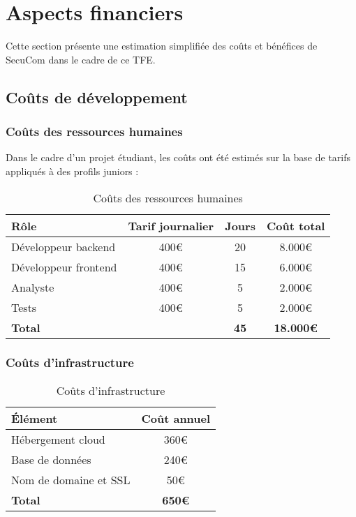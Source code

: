 \chapter{Aspects financiers}

Cette section présente une estimation simplifiée des coûts et bénéfices de SecuCom dans le cadre de ce TFE.

\section{Coûts de développement}

\subsection{Coûts des ressources humaines}

Dans le cadre d'un projet étudiant, les coûts ont été estimés sur la base de tarifs appliqués à des profils juniors :
\begin{table}[h]
\centering
\begin{tabular}{|l|c|c|c|}
\hline
\textbf{Rôle} & \textbf{Tarif journalier} & \textbf{Jours} & \textbf{Coût total} \\
\hline
Développeur backend & 400€ & 20 & 8.000€ \\
Développeur frontend & 400€ & 15 & 6.000€ \\
Analyste & 400€ & 5 & 2.000€ \\
Tests & 400€ & 5 & 2.000€ \\
\hline
\textbf{Total} & & \textbf{45} & \textbf{18.000€} \\
\hline
\end{tabular}
\caption{Coûts des ressources humaines}
\end{table}

\subsection{Coûts d'infrastructure}

\begin{table}[h]
\centering
\begin{tabular}{|l|c|}
\hline
\textbf{Élément} & \textbf{Coût annuel} \\
\hline
Hébergement cloud & 360€ \\
Base de données & 240€ \\
Nom de domaine et SSL & 50€ \\
\hline
\textbf{Total} & \textbf{650€} \\
\hline
\end{tabular}
\caption{Coûts d'infrastructure}
\end{table}

